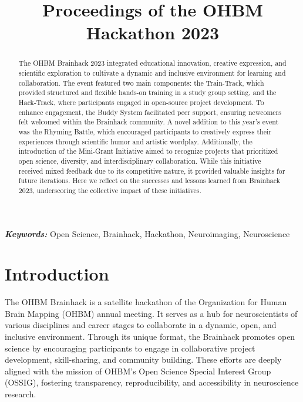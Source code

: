 \documentclass{article}
\title{Proceedings of the OHBM Hackathon 2023}
\date{}
\begin{document}
\maketitle

\pagebreak

\begin{abstract}
    The OHBM Brainhack 2023 integrated educational innovation, creative expression, and scientific exploration to cultivate a dynamic and inclusive environment for learning and collaboration. The event featured two main components: the Train-Track, which provided structured and flexible hands-on training in a study group setting, and the Hack-Track, where participants engaged in open-source project development. To enhance engagement, the Buddy System facilitated peer support, ensuring newcomers felt welcomed within the Brainhack community. A novel addition to this year’s event was the Rhyming Battle, which encouraged participants to creatively express their experiences through scientific humor and artistic wordplay. Additionally, the introduction of the Mini-Grant Initiative aimed to recognize projects that prioritized open science, diversity, and interdisciplinary collaboration. While this initiative received mixed feedback due to its competitive nature, it provided valuable insights for future iterations. Here we reflect on the successes and lessons learned from Brainhack 2023, underscoring the collective impact of these initiatives.
\end{abstract}

\textbf{\textit{Keywords:}} Open Science, Brainhack, Hackathon, Neuroimaging, Neuroscience


\section{Introduction}

The OHBM Brainhack is a satellite hackathon of the Organization for Human Brain Mapping (OHBM) annual meeting.
It serves as a hub for neuroscientists of various disciplines and career stages to collaborate in a dynamic, open, and inclusive environment.
Through its unique format, the Brainhack promotes open science by encouraging participants to engage in collaborative project development, skill-sharing, and community building.
These efforts are deeply aligned with the mission of OHBM’s Open Science Special Interest Group (OSSIG), fostering transparency, reproducibility, and accessibility in neuroscience research.
\end{document}
